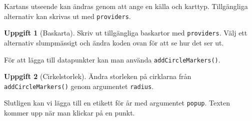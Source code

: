 \documentclass[
]{book}
\newenvironment{Shaded}{\begin{snugshade}}{\end{snugshade}}
\newcommand{\AttributeTok}[1]{\textcolor[rgb]{0.13,0.29,0.53}{#1}}
\newcommand{\DecValTok}[1]{\textcolor[rgb]{0.00,0.00,0.81}{#1}}
\newcommand{\FunctionTok}[1]{\textcolor[rgb]{0.13,0.29,0.53}{\textbf{#1}}}
\newcommand{\NormalTok}[1]{#1}
\newcommand{\SpecialCharTok}[1]{\textcolor[rgb]{0.81,0.36,0.00}{\textbf{#1}}}
\theoremstyle{definition}
\theoremstyle{definition}
\theoremstyle{definition}
\newtheorem{exercise}{Uppgift}[chapter]
\theoremstyle{definition}
\theoremstyle{remark}
\begin{document}
Kartans utseende kan ändras genom att ange en källa och karttyp. Tillgängliga alternativ kan skrivas ut med \texttt{providers}.

\begin{Shaded}
\end{Shaded}

\begin{exercise}[Baskarta]
Skriv ut tillgängliga baskartor med \texttt{providers}. Välj ett alternativ slumpmässigt och ändra koden ovan för att se hur det ser ut.
\end{exercise}

För att lägga till datapunkter kan man använda \texttt{addCircleMarkers()}.

\begin{Shaded}
\end{Shaded}

\begin{exercise}[Cirkelstorlek]
Ändra storleken på cirklarna från \texttt{addCircleMarkers()} genom argumentet \texttt{radius}.
\end{exercise}

Slutligen kan vi lägga till en etikett för år med argumentet \texttt{popup}. Texten kommer upp när man klickar på en punkt.

\begin{Shaded}
\end{Shaded}
\end{document}
